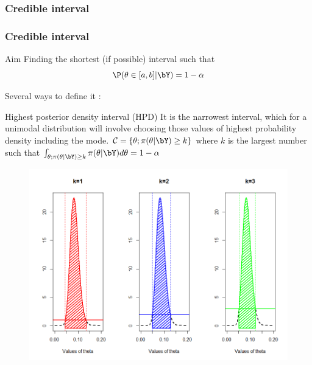    
\subsubsection{Credible interval}
  
\begin{frame}[allowframebreaks]\frametitle{Credible interval }

  \begin{block}{Aim}
 Finding the shortest (if possible)  interval such that $$\P(\theta \in [a,b] | \bY) = 1- \alpha$$
 \end{block}
 
 Several ways to define it : 
 
\begin{block}{Highest posterior density interval  (HPD)}
It is the narrowest interval, which for a unimodal distribution will involve choosing those values of highest probability density including the mode.
 $ \mathcal{C} = \{\theta;\pi(\theta  | \bY)  \geq k\} $ where $k$ is the largest number such that $\int_{\theta; \pi(\theta  | \bY) \geq k} \pi(\theta | \bY) d\theta=1- \alpha$ 
\end{block}

\begin{figure}
\centering 
 \includegraphics[width=\linewidth]{figures/HPD.png}
 \end{figure}
\end{frame}


